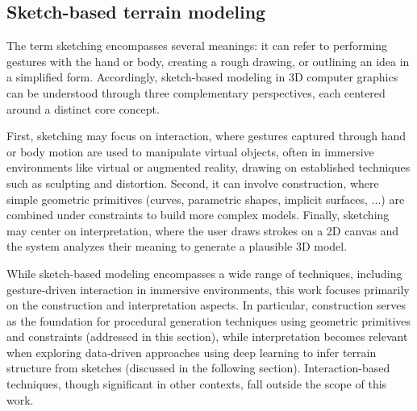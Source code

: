 

\subsection{Sketch-based terrain modeling}
\label{sec:coral-island_sota-sketches}


The term sketching encompasses several meanings: it can refer to performing gestures with the hand or body, creating a rough drawing, or outlining an idea in a simplified form. Accordingly, sketch-based modeling in 3D computer graphics can be understood through three complementary perspectives, each centered around a distinct core concept.

First, sketching may focus on interaction, where gestures captured through hand or body motion are used to manipulate virtual objects, often in immersive environments like virtual or augmented reality, drawing on established techniques such as sculpting and distortion. Second, it can involve construction, where simple geometric primitives (curves, parametric shapes, implicit surfaces, ...) are combined under constraints to build more complex models. Finally, sketching may center on interpretation, where the user draws strokes on a 2D canvas and the system analyzes their meaning to generate a plausible 3D model.

While sketch-based modeling encompasses a wide range of techniques, including gesture-driven interaction in immersive environments, this work focuses primarily on the construction and interpretation aspects. In particular, construction serves as the foundation for procedural generation techniques using geometric primitives and constraints (addressed in this section), while interpretation becomes relevant when exploring data-driven approaches using deep learning to infer terrain structure from sketches (discussed in the following section). Interaction-based techniques, though significant in other contexts, fall outside the scope of this work. 

